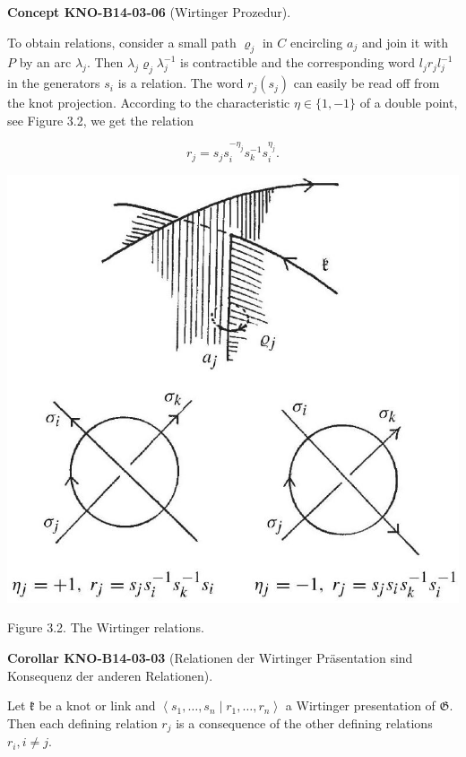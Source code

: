 \documentclass[10pt, letterpaper]{article}
\newcommand{\CustomHeading}[3]{%
  \par\medskip\noindent%
  \textbf{#1 #2} \textnormal{(#3)}.\enskip%
}
\newenvironment{KORO}[2]{\CustomHeading{Corollar}{#1}{#2}}{}
\newenvironment{CONC}[2]{\CustomHeading{Concept}{#1}{#2}}{}
\begin{document}
\begin{CONC}{KNO-B14-03-06}{Wirtinger Prozedur}
To obtain relations, consider a small path $\varrho_{j}$ in $C$ encircling $a_{j}$ and join it with $P$ by an arc $\lambda_{j}$. Then $\lambda_{j} \varrho_{j} \lambda_{j}^{-1}$ is contractible and the corresponding word $l_{j} r_{j} l_{j}^{-1}$ in the generators $s_{i}$ is a relation. The word $r_{j}\left(s_{j}\right)$ can easily be read off from the knot projection. According to the characteristic $\eta \in\{1,-1\}$ of a double point, see Figure 3.2, we get the relation

$$
r_{j}=s_{j} s_{i}^{-\eta_{j}} s_{k}^{-1} s_{i}^{\eta_{j}} .
$$

\begin{center}
\includegraphics[scale=0.2]{2025_05_21_9c06be8de7a55410f8c1g-047}
\end{center}
Figure 3.2. The Wirtinger relations.
\end{CONC}

\begin{KORO}{KNO-B14-03-03}{Relationen der Wirtinger Präsentation sind Konsequenz der anderen Relationen}
Let $\mathfrak{k}$ be a knot or link and $\left\langle s_{1}, \ldots, s_{n} \mid r_{1}, \ldots, r_{n}\right\rangle$ a Wirtinger presentation of $\mathfrak{G}$. Then each defining relation $r_{j}$ is a consequence of the other defining relations $r_{i}, i \neq j$.
\end{KORO}
\end{document}
